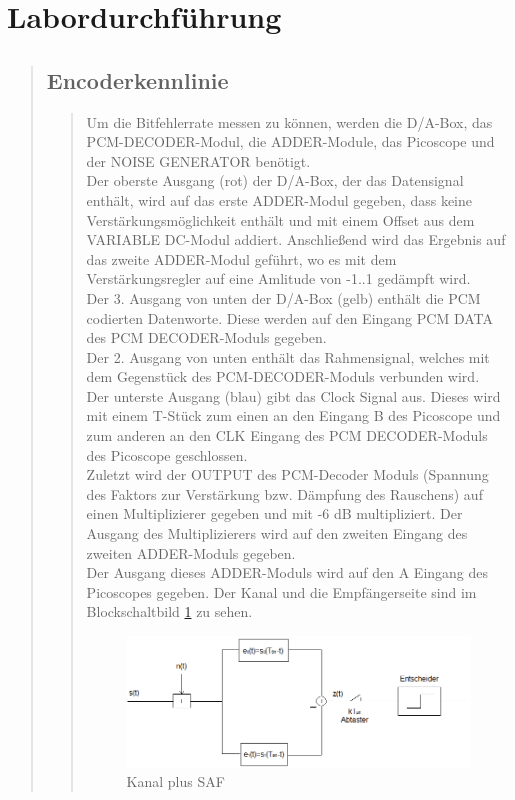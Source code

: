 \section{Labordurchführung}
\begin{quote}
    
    
    \subsection{Encoderkennlinie}
    \begin{quote}
        
        Um die Bitfehlerrate messen zu können, werden die D/A-Box, das PCM-DECODER-Modul, die ADDER-Module, das
        Picoscope und der NOISE GENERATOR benötigt.\\
       Der oberste Ausgang (rot) der D/A-Box, der das Datensignal enthält, wird auf das erste ADDER-Modul gegeben, dass
       keine Verstärkungsmöglichkeit enthält und mit einem Offset aus dem VARIABLE DC-Modul addiert. Anschließend wird
       das Ergebnis auf das zweite ADDER-Modul geführt, wo es mit dem Verstärkungsregler auf eine Amlitude von -1..1
       gedämpft wird.\\
       Der 3. Ausgang von unten der D/A-Box (gelb) enthält die PCM codierten Datenworte. Diese werden auf den Eingang
       PCM DATA des PCM DECODER-Moduls gegeben.\\
       Der 2. Ausgang von unten enthält das Rahmensignal, welches mit dem Gegenstück des PCM-DECODER-Moduls verbunden
       wird.\\
       Der unterste Ausgang (blau) gibt das Clock Signal aus. Dieses wird mit einem T-Stück zum einen an den Eingang B
       des Picoscope und zum anderen an den CLK Eingang des PCM DECODER-Moduls des Picoscope geschlossen.\\
       Zuletzt wird der OUTPUT des PCM-Decoder Moduls (Spannung des Faktors zur Verstärkung bzw. Dämpfung des
       Rauschens) auf einen Multiplizierer gegeben und mit -6 dB multipliziert. Der Ausgang des Multiplizierers wird auf den
       zweiten Eingang des zweiten ADDER-Moduls gegeben.\\
       Der Ausgang dieses ADDER-Moduls wird auf den A Eingang des Picoscopes gegeben.
       Der Kanal und die Empfängerseite sind im Blockschaltbild \ref{fig:Kanal_pl_SAF} zu sehen.
       
       
    \begin{figure}[H]
        \centering
        \includegraphics[scale=0.7]{Bilder/SAF-Filter}
        \caption{Kanal plus SAF}
        \label{fig:Kanal_pl_SAF}
    \end{figure}
     

\end{quote}
\end{quote}
